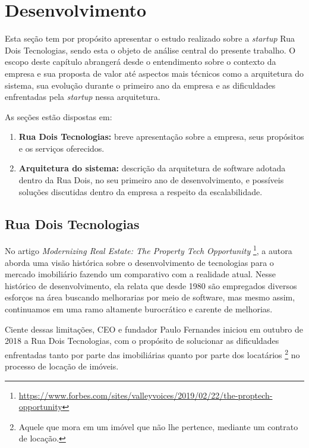 \chapter{Desenvolvimento}

Esta seção tem por propósito apresentar o estudo realizado sobre a
\textit{startup} Rua Dois Tecnologias, sendo esta o objeto de análise
central do presente trabalho. O escopo deste capítulo abrangerá desde
o entendimento sobre o contexto da empresa e sua proposta de valor
até aspectos mais técnicos como a arquitetura do sistema, sua evolução
durante o primeiro ano da empresa e as dificuldades enfrentadas pela
\textit{startup} nessa arquitetura.

  As seções estão dispostas em:

  \begin{enumerate}
    \item \textbf{Rua Dois Tecnologias:} breve apresentação sobre a empresa,
      seus propósitos e os serviços oferecidos.
    \item \textbf{Arquitetura do sistema:} descrição da arquitetura de software
      adotada dentro da Rua Dois, no seu primeiro ano de desenvolvimento, e possíveis
      soluções discutidas dentro da empresa a respeito da escalabilidade.
  \end{enumerate}

\section{Rua Dois Tecnologias}

No artigo \textit{Modernizing Real Estate: The Property Tech Opportunity}
\footnote{\url{https://www.forbes.com/sites/valleyvoices/2019/02/22/the-proptech-opportunity}},
a autora  aborda uma visão histórica sobre o desenvolvimento
de tecnologias para o mercado imobiliário fazendo um comparativo com a realidade atual.
Nesse histórico de desenvolvimento, ela relata que desde 1980 são empregados
diversos esforços na área buscando melhorarias por meio de software, mas mesmo
assim, continuamos em uma ramo altamente burocrático e carente de melhorias.

Ciente dessas limitações, CEO e fundador Paulo Fernandes iniciou em outubro de 2018 a
Rua Dois Tecnologias, com o propósito de solucionar as dificuldades
enfrentadas tanto por parte das imobiliárias quanto por parte dos locatários
\footnote{Aquele que mora em um imóvel que não lhe pertence, mediante um
contrato de locação.} no processo de locação de imóveis.

